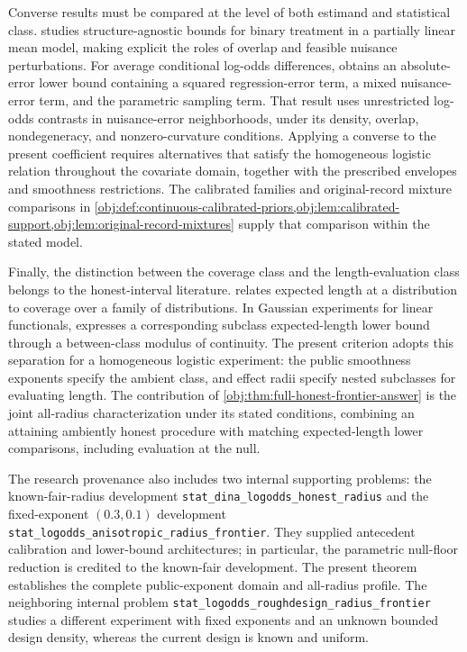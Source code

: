 Converse results must be compared at the level of both estimand and statistical class. \citet[Appendix B]{JinMackeySyrgkanis2025HardNormal} studies structure-agnostic bounds for binary treatment in a partially linear mean model, making explicit the roles of overlap and feasible nuisance perturbations. For average conditional log-odds differences, \citet[version 2, Theorem 7.7]{JinSyrgkanis2025GeneralLinearLower} obtains an absolute-error lower bound containing a squared regression-error term, a mixed nuisance-error term, and the parametric sampling term. That result uses unrestricted log-odds contrasts in nuisance-error neighborhoods, under its density, overlap, nondegeneracy, and nonzero-curvature conditions. Applying a converse to the present coefficient requires alternatives that satisfy the homogeneous logistic relation throughout the covariate domain, together with the prescribed envelopes and smoothness restrictions. The calibrated families and original-record mixture comparisons in \cref{obj:def:continuous-calibrated-priors,obj:lem:calibrated-support,obj:lem:original-record-mixtures} supply that comparison within the stated model.

Finally, the distinction between the coverage class and the length-evaluation class belongs to the honest-interval literature. \citet{Low1997} relates expected length at a distribution to coverage over a family of distributions. In Gaussian experiments for linear functionals, \citet[Section 2, Theorem 1]{CaiLow2004ConfidenceAdaptation} expresses a corresponding subclass expected-length lower bound through a between-class modulus of continuity. The present criterion adopts this separation for a homogeneous logistic experiment: the public smoothness exponents specify the ambient class, and effect radii specify nested subclasses for evaluating length. The contribution of \cref{obj:thm:full-honest-frontier-answer} is the joint all-radius characterization under its stated conditions, combining an attaining ambiently honest procedure with matching expected-length lower comparisons, including evaluation at the null.

The research provenance also includes two internal supporting problems: the known-fair-radius development \texttt{stat\_dina\_logodds\_honest\_radius} and the fixed-exponent \((0.3,0.1)\) development \texttt{stat\_logodds\_anisotropic\_radius\_frontier}. They supplied antecedent calibration and lower-bound architectures; in particular, the parametric null-floor reduction is credited to the known-fair development. The present theorem establishes the complete public-exponent domain and all-radius profile. The neighboring internal problem \texttt{stat\_logodds\_roughdesign\_radius\_frontier} studies a different experiment with fixed exponents and an unknown bounded design density, whereas the current design is known and uniform.
